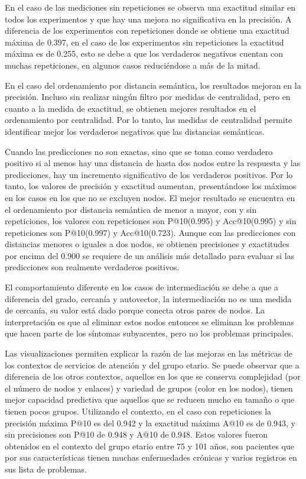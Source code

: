 En el caso de las mediciones sin repeticiones se observa una exactitud similar en todos los experimentos y que hay una mejora no significativa en la precisión. A diferencia de los experimentos con repeticiones donde se obtiene una exactitud máxima de \num{0,397}, en el caso de los experimentos sin repeticiones la exactitud máxima es de \num{0,255}, esto se debe a que los verdaderos negativos cuentan con muchas repeticiones, en algunos casos reduciéndose a más de la mitad.

En el caso del ordenamiento por distancia semántica,  los resultados mejoran  en la precisión. Incluso sin realizar ningún filtro por medidas de centralidad, pero en cuanto a la medida de exactitud, se obtienen mejores resultados en el ordenamiento por centralidad. Por lo tanto, las medidas de centralidad permite identificar mejor los verdaderos negativos que las distancias semánticas.

Cuando las predicciones no son exactas, sino que se toma como verdadero positivo si al menos hay una distancia de hasta dos nodos entre la respuesta y las predicciones, hay un incremento significativo de los verdaderos positivos. Por lo tanto, los valores de precisión y exactitud aumentan, presentándose los máximos en los casos en los que no se excluyen nodos.  El mejor resultado se encuentra en el ordenamiento por distancia semántica de menor a mayor, con y sin repeticiones, los valores con repeticiones son P@10(\num{0,995}) y Acc@10(\num{0,995}) y sin repeticiones son P@10(\num{0,997}) y Acc@10(\num{0,723}).  Aunque con las predicciones con distancias menores o iguales a dos nodos, se obtienen precisiones y exactitudes por encima del \num{0.900} se requiere de un análisis más detallado para evaluar si las predicciones son realmente verdaderos positivos. 

El comportamiento diferente en los casos de intermediación se debe a que a diferencia del grado, cercanía y autovector, la intermediación no es una medida de cercanía, su valor está dado porque conecta otros pares de nodos. La interpretación es que al eliminar estos nodos entonces se eliminan los problemas que hacen parte de los síntomas subyacentes, pero no los problemas principales.

Las visualizaciones permiten explicar la razón de las mejoras en las métricas de los contextos de servicios de atención y del grupo etario. Se puede observar que a diferencia de los otros contextos, aquellos en los que se conserva complejidad (por el número de nodos y enlaces) y variedad de grupos (color en los nodos), tienen mejor capacidad predictiva que aquellos que se reducen mucho en tamaño o que tienen pocos grupos. Utilizando el contexto, en el caso con repeticiones la precisión máxima P@10 es del \num{0.942} y la exactitud máxima A@10 es de \num{0.943}, y sin precisiones son P@10 de \num{0.948} y A@10 de \num{0.948}. Estos valores fueron obtenidos en el contexto del grupo etario entre 75 y 101 años, son pacientes que por sus características tienen muchas enfermedades crónicas y varios registros en sus lista de problemas. 

